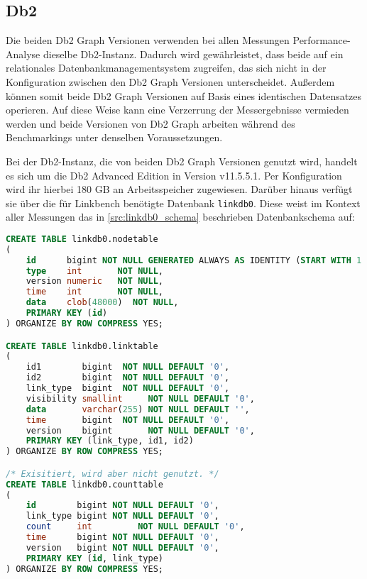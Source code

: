 \subsection{Db2}
Die beiden Db2 Graph Versionen verwenden bei allen Messungen Performance-Analyse dieselbe Db2-Instanz. Dadurch wird gewährleistet, dass beide auf ein relationales Datenbankmanagementsystem zugreifen, das sich nicht in der Konfiguration zwischen den Db2 Graph Versionen unterscheidet. Außerdem können somit beide Db2 Graph Versionen auf Basis eines identischen Datensatzes operieren. Auf diese Weise kann eine Verzerrung der Messergebnisse vermieden werden und beide Versionen von Db2 Graph arbeiten während des Benchmarkings unter denselben Voraussetzungen.

Bei der Db2-Instanz, die von beiden Db2 Graph Versionen genutzt wird, handelt es sich um die Db2 Advanced Edition in Version v11.5.5.1. Per Konfiguration wird ihr hierbei 180 GB an Arbeitsspeicher zugewiesen. Darüber hinaus verfügt sie über die für Linkbench benötigte Datenbank \texttt{linkdb0}. Diese weist im Kontext aller Messungen das in \autoref{src:linkdb0_schema} beschrieben Datenbankschema auf:

\begin{lstlisting}[label=src:linkdb0_schema,caption={Db2-Instanz Datenbankschema für linkdb0},language=SQL]
CREATE TABLE linkdb0.nodetable
(
    id      bigint NOT NULL GENERATED ALWAYS AS IDENTITY (START WITH 1 INCREMENT BY 1),
    type    int       NOT NULL,
    version numeric   NOT NULL,
    time    int       NOT NULL,
    data    clob(48000)  NOT NULL,
    PRIMARY KEY (id)
) ORGANIZE BY ROW COMPRESS YES;

CREATE TABLE linkdb0.linktable
(
    id1        bigint  NOT NULL DEFAULT '0',
    id2        bigint  NOT NULL DEFAULT '0',
    link_type  bigint  NOT NULL DEFAULT '0',
    visibility smallint     NOT NULL DEFAULT '0',
    data       varchar(255) NOT NULL DEFAULT '',
    time       bigint  NOT NULL DEFAULT '0',
    version    bigint       NOT NULL DEFAULT '0',
    PRIMARY KEY (link_type, id1, id2)
) ORGANIZE BY ROW COMPRESS YES;

/* Exisitiert, wird aber nicht genutzt. */
CREATE TABLE linkdb0.counttable
(
    id        bigint NOT NULL DEFAULT '0',
    link_type bigint NOT NULL DEFAULT '0',
    count     int         NOT NULL DEFAULT '0',
    time      bigint NOT NULL DEFAULT '0',
    version   bigint NOT NULL DEFAULT '0',
    PRIMARY KEY (id, link_type)
) ORGANIZE BY ROW COMPRESS YES;
\end{lstlisting}

